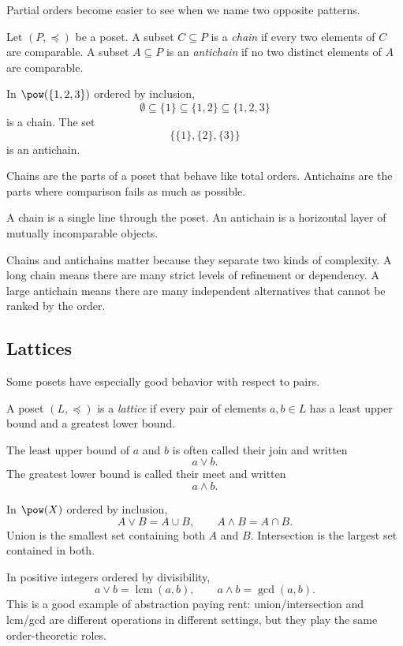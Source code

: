 Partial orders become easier to see when we name two opposite patterns.

\begin{definition}
Let $(P,\preceq)$ be a poset. A subset $C\subseteq P$ is a \emph{chain} if every two elements of $C$ are comparable. A subset $A\subseteq P$ is an \emph{antichain} if no two distinct elements of $A$ are comparable.
\end{definition}

In $\pow(\{1,2,3\})$ ordered by inclusion,
\[
\emptyset\subseteq\{1\}\subseteq\{1,2\}\subseteq\{1,2,3\}
\]
is a chain. The set
\[
\{\{1\},\{2\},\{3\}\}
\]
is an antichain.

Chains are the parts of a poset that behave like total orders. Antichains are the parts where comparison fails as much as possible.

\begin{intuitionbox}
A chain is a single line through the poset. An antichain is a horizontal layer of mutually incomparable objects.
\end{intuitionbox}

Chains and antichains matter because they separate two kinds of complexity. A long chain means there are many strict levels of refinement or dependency. A large antichain means there are many independent alternatives that cannot be ranked by the order.

\subsection{Lattices}

Some posets have especially good behavior with respect to pairs.

\begin{definition}
A poset $(L,\preceq)$ is a \emph{lattice} if every pair of elements $a,b\in L$ has a least upper bound and a greatest lower bound.
\end{definition}

The least upper bound of $a$ and $b$ is often called their join and written
\[
a\vee b.
\]
The greatest lower bound is called their meet and written
\[
a\wedge b.
\]

In $\pow(X)$ ordered by inclusion,
\[
A\vee B=A\cup B,\qquad A\wedge B=A\cap B.
\]
Union is the smallest set containing both $A$ and $B$. Intersection is the largest set contained in both.

In positive integers ordered by divisibility,
\[
a\vee b=\operatorname{lcm}(a,b),\qquad a\wedge b=\gcd(a,b).
\]
This is a good example of abstraction paying rent: union/intersection and lcm/gcd are different operations in different settings, but they play the same order-theoretic roles.

